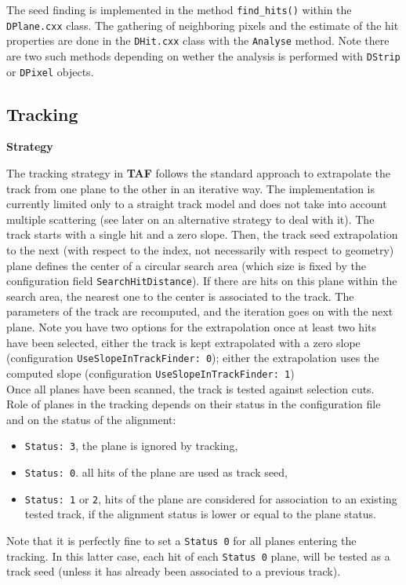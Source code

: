 \documentclass[a4paper, 12pt, twoside]{article}
\newcommand{\TAF}{{\bf TAF }}
\begin{document}
\noindent
The seed finding is implemented in the method {\tt find\_hits()} within the {\tt DPlane.cxx} class. The gathering of neighboring pixels and the estimate of the hit properties are done in the {\tt DHit.cxx} class with the {\tt Analyse} method. Note there are two such methods depending on wether the analysis is performed with {\tt DStrip} or {\tt DPixel} objects.


\subsection{Tracking}
\label{subsecTracking}

\noindent
{\bf Strategy}

\noindent
The tracking strategy in \TAF follows the standard approach to extrapolate the track from one plane to the other in an iterative way. The implementation is currently limited only to a straight track model and does not take into account multiple scattering (see later on an alternative strategy to deal with it).  The track starts with a single hit and a zero slope. Then, the track seed extrapolation to the next (with respect to the index, not necessarily with respect to geometry) plane defines the center of a circular search area (which size is fixed by the configuration field {\tt SearchHitDistance}). If there are hits on this plane within the search area, the nearest one to the center is associated to the track. The parameters of the track are recomputed, and the iteration goes on with the next plane. Note you have two options for the extrapolation once at least two hits have been selected, either the track is kept extrapolated with a zero slope (configuration {\tt UseSlopeInTrackFinder: 0}); either the extrapolation uses the computed slope (configuration {\tt UseSlopeInTrackFinder: 1})\\
Once all planes have been scanned, the track is tested against selection cuts.\\

\noindent
Role of planes in the tracking depends on their status in the configuration file and on the status of the alignment:
\begin{itemize}
\item {\tt Status: 3}, the plane is ignored by tracking,
\item {\tt Status: 0}. all hits of the plane are used as track seed,
\item {\tt Status: 1} or {\tt 2}, hits of the plane are considered for association to an existing tested track, if the alignment status is lower or equal to the plane status.
\end{itemize}
Note that it is perfectly fine to set a {\tt Status 0}  for all planes entering the tracking. In this latter case, each hit of each {\tt Status 0} plane, will be tested as a track seed (unless it has already been associated to a previous track).
\end{document}
